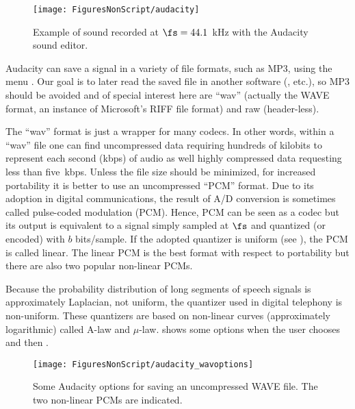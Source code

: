 \begin{figure}
	\centering
		\texttt{[image: FiguresNonScript/audacity]}
	\caption{Example of sound recorded at $\fs=44.1$~kHz with the Audacity sound editor.\label{fig:audacity}}
\end{figure}

Audacity can save a signal in a variety of file formats, such as MP3, using the menu . Our goal is to later read the saved file in another software ({\matlab}, etc.), so MP3 should be avoided and of special interest here are ``wav'' (actually the WAVE format, an instance of Microsoft's RIFF file format) and raw (header-less). 

The ``wav'' format is just a wrapper for many codecs. In other words, within a ``wav'' file one can find uncompressed data requiring hundreds of kilobits to represent each second (kbps) of audio as well highly compressed data requesting less than five~kbps. Unless the file size should be minimized, for increased portability it is better to use an uncompressed ``PCM'' format. Due to its adoption in digital communications, the result of A/D conversion is sometimes called pulse-coded modulation (PCM). Hence, PCM can be seen as a codec but its output is equivalent to a signal simply sampled at $\fs$ and quantized (or encoded) with $b$ bits/sample. If the adopted quantizer is uniform (see ), the PCM is called linear. The linear PCM is the best format with respect to portability but there are also two popular non-linear PCMs.

Because the probability distribution of long segments of speech signals is approximately Laplacian, not uniform, the quantizer used in digital telephony is non-uniform. These quantizers are based on non-linear curves (approximately logarithmic) called A-law and $\mu$-law.  shows some options when the user chooses  and then .

\begin{figure}
	\centering
		\texttt{[image: FiguresNonScript/audacity\_wavoptions]}
	\caption{Some Audacity options for saving an uncompressed WAVE file. The two non-linear PCMs are indicated.\label{fig:audacity_wavoptions}}
\end{figure}

